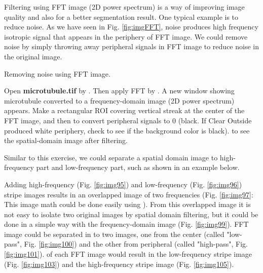 Filtering using FFT image (2D power spectrum) is a way of improving image quality and
also for a better segmentation result. One typical example is to reduce noise. As we have seen in Fig. \ref{fig:imgFFT}, noise produces high frequency
isotropic signal that appears in the periphery of FFT image. We
could remove noise by simply throwing away peripheral signals in FFT
image to reduce noise in the original image. 

\begin{indentexercise}{1} Removing noise using FFT image. 

Open \textbf{microtubule.tif} by . Then apply FFT
by . A new
window showing microtubule converted to a frequency-domain image (2D power spectrum) appears. Make
a rectangular ROI covering vertical streak at the center of the FFT
image, and then  to
convert peripheral signals to 0 (black. If Clear Outside produced white
periphery, check  to
see if the background color is black).  to see the spatial-domain image after
filtering.
\end{indentexercise}

Similar to this exercise, we could separate a spatial domain image to high-frequency part
and low-frequency part, such as shown
in an example below.
 
Adding high-frequency (Fig. \ref{fig:img95}) and low-frequency (Fig. \ref{fig:img96}) stripe images 
results in an overlapped image of two frequencies (Fig. \ref{fig:img97}: This image math could be done
easily using  ). From this overlapped image it is not easy
to isolate two original images by spatial domain filtering, but
it could be done in a simple way with the frequency-domain image (Fig. \ref{fig:img99}). 
FFT image could be separated in to two images, one from the center (called "low-pass", Fig. \ref{fig:img100}) 
and the other from peripheral (called "high-pass",  Fig. \ref{fig:img101}). 
 of each FFT image would result in the low-frequency stripe image  (Fig. \ref{fig:img103}) and
the high-frequency stripe image (Fig. \ref{fig:img105}).

